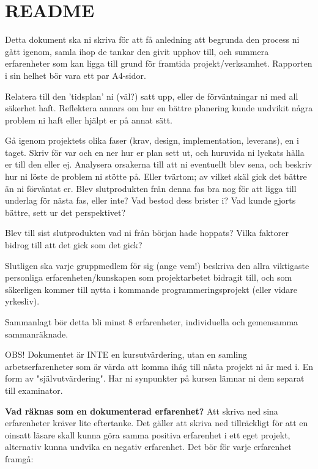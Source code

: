 \section{README}
Detta dokument ska ni skriva för att få anledning att begrunda den
process ni gått igenom, samla ihop de tankar den givit upphov till,
och summera erfarenheter som kan ligga till grund för framtida
projekt/verksamhet. Rapporten i sin helhet bör vara ett par A4-sidor.

Relatera till den 'tidsplan' ni (väl?) satt upp, eller de
förväntningar ni med all säkerhet haft. Reflektera annars om hur en
bättre planering kunde undvikit några problem ni haft eller hjälpt er
på annat sätt.

Gå igenom projektets olika faser (krav, design, implementation,
leverans), en i taget. Skriv för var och en ner hur er plan sett ut,
och huruvida ni lyckats hålla er till den eller ej. Analysera
orsakerna till att ni eventuellt blev sena, och beskriv hur ni löste
de problem ni stötte på. Eller tvärtom; av vilket skäl gick det bättre
än ni förväntat er. Blev slutprodukten från denna fas bra nog för att
ligga till underlag för nästa fas, eller inte? Vad bestod dess brister
i? Vad kunde gjorts bättre, sett ur det perspektivet?

Blev till sist slutprodukten vad ni från början hade hoppats? Vilka
faktorer bidrog till att det gick som det gick?

Slutligen ska varje gruppmedlem för sig (ange vem!) beskriva den allra
viktigaste personliga erfarenheten/kunskapen som projektarbetet
bidragit till, och som säkerligen kommer till nytta i kommande
programmeringsprojekt (eller vidare yrkesliv).

Sammanlagt bör detta bli minst 8 erfarenheter, individuella och
gemensamma sammanräknade.

OBS! Dokumentet är INTE en kursutvärdering, utan en samling
arbetserfarenheter som är värda att komma ihåg till nästa projekt ni
är med i.  En form av "självutvärdering". Har ni synpunkter på kursen
lämnar ni dem separat till examinator.

\textbf{Vad räknas som en dokumenterad erfarenhet?}  Att skriva ned
sina erfarenheter kräver lite eftertanke. Det gäller att skriva ned
tillräckligt för att en oinsatt läsare skall kunna göra samma positiva
erfarenhet i ett eget projekt, alternativ kunna undvika en negativ
erfarenhet. Det bör för varje erfarenhet framgå:

